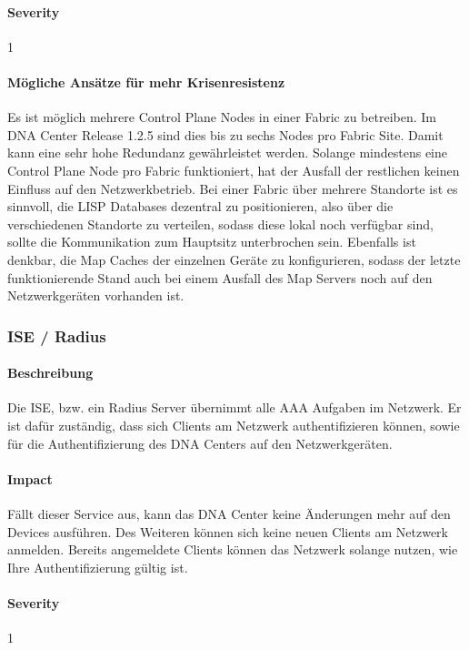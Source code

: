 \paragraph{Severity} 1

\paragraph{Mögliche Ansätze für mehr Krisenresistenz}

Es ist möglich mehrere Control Plane Nodes in einer Fabric zu betreiben. Im DNA Center Release 1.2.5 sind dies bis zu sechs Nodes pro Fabric Site. Damit kann eine sehr hohe Redundanz gewährleistet werden. Solange mindestens eine Control Plane Node pro Fabric funktioniert, hat der Ausfall der restlichen keinen Einfluss auf den Netzwerkbetrieb. Bei einer Fabric über mehrere Standorte ist es sinnvoll, die LISP Databases dezentral zu positionieren, also über die verschiedenen Standorte zu verteilen, sodass diese lokal noch verfügbar sind, sollte die Kommunikation zum Hauptsitz unterbrochen sein. Ebenfalls ist denkbar, die Map Caches der einzelnen Geräte zu konfigurieren, sodass der letzte funktionierende Stand auch bei einem Ausfall des Map Servers noch auf den Netzwerkgeräten vorhanden ist. 

\subsubsection{ISE / Radius}

\paragraph{Beschreibung}

Die ISE, bzw. ein Radius Server übernimmt alle AAA Aufgaben im Netzwerk. Er ist dafür zuständig, dass sich Clients am Netzwerk authentifizieren können, sowie für die Authentifizierung des DNA Centers auf den Netzwerkgeräten.

\paragraph{Impact}

Fällt dieser Service aus, kann das DNA Center keine Änderungen mehr auf den Devices ausführen. Des Weiteren können sich keine neuen Clients am Netzwerk anmelden. Bereits angemeldete Clients können das Netzwerk solange nutzen, wie Ihre Authentifizierung gültig ist.

\paragraph{Severity} 1

